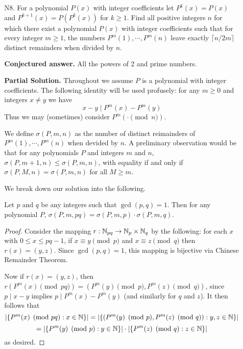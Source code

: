 \documentclass[11pt,a4paper]{article}
\begin{document}
\begin{enumerate}
	    \item [N8.]
	    For a polynomial $P(x)$ with integer coefficients let $P^{1}(x) = P(x)$ and $P^{k+1}(x) = P(P^k(x))$ for $k \ge 1$. 
	    Find all positive integers $n$ for which there exist a polynomial $P(x)$ with integer coefficients such that for every integer $m \ge 1$, 
	    the numbers $P^m(1), \cdots, P^ m(n)$ leave exactly $\lceil n/2m\rceil$ distinct remainders when divided by $n$. 
	    
	    \textbf{Conjectured answer.} All the powers of 2 and prime numbers. 
	    
	    \textbf{Partial Solution.} 
	    Throughout we assume $P$ is a polynomial with integer coefficients. 
	    The following identity will be used profusely: for any $m\ge 0$ and integers $x\neq y$ we have 
	    \[
	    x-y\mid P^m(x)-P^m(y)
	    \]
	    Thus we may (sometimes) consider $P^m(\cdot \pmod{n})$. 
	    
	    We define $\sigma(P, m, n)$ as the number of distinct reimainders of $P^m(1), \cdots, P^m(n)$ when devided by $n$. 
	    A preliminary observation would be that for any polynomials $P$ and integers $m$ and $n$, 
	    $\sigma(P, m + 1, n)\le \sigma(P, m, n)$, with equality if and only if $\sigma(P, M, n)=\sigma(P, m, n)$ for all $M\ge m$. 
	    
	    We break down our solution into the following. 
	    
	    \begin{lemma}
	    	\label{lemma_n8a}
	    	Let $p$ and $q$ be any integers such that $\gcd(p, q)=1$. 
	    	Then for any polynomial $P$, $\sigma(P, m, pq)=\sigma(P, m, p)\cdot \sigma(P, m, q)$. 
	    \end{lemma}
        
        \begin{proof}
        	Consider the mapping $r: {\mathbb N}_{pq}\to {\mathbb N}_{p}\times {\mathbb N}_{q}$ by the following: 
        	for each $x$ with $0\le x\le pq-1$, if $x\equiv y\pmod{p}$ and $x\equiv z\pmod{q}$ 
        	then $r(x)=(y, z)$. Since $\gcd(p, q)=1$, this mapping is bijective via Chinese Remainder Theorem. 
        	
        	Now if $r(x)=(y, z)$, then $r(P^m(x)\pmod{pq})=(P^m(y)\pmod{p}, P^m(z)\pmod{q})$, since 
        	$p\mid x-y$ implies $p\mid P^m(x) - P^m(y)$ (and similarly for $q$ and $z$). It then follows that 
        	\[
        	|\{P^m(x)\pmod{pq}: x\in{\mathbb N}\}|
        	=|\{(P^m(y)\pmod{p}, P^m(z)\pmod{q}): y, z\in{\mathbb N}\}|
        	\]
        	\[
        	=|\{P^m(y)\pmod{p}: y\in{\mathbb N}\}|\cdot |\{ P^m(z)\pmod{q}: z\in{\mathbb N}\}|
        	\]
        	as desired. 
        \end{proof}
    

\end{enumerate}
\end{document}
